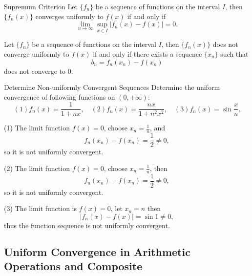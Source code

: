 \begin{theorem}{Supremum Criterion}{}
  Let $\{f_n\}$ be a sequence of functions on the interval $I$, then
  $\{f_n(x)\}$ converges uniformly to $f(x)$ if and only if
  \begin{equation}
    \lim \limits _{n \rightarrow \infty} \sup \limits_{x \in I} |f_n(x) - f(x)| = 0.
  \end{equation}
\end{theorem}

\begin{corollary}{}{}
  Let $\{f_n\}$ be a sequence of functions on the interval $I$, then
  $\{f_n(x)\}$ does not converge uniformly to $f(x)$ if and only if
  there exists a sequence $\{x_n\}$ such that
  \begin{equation}
    b_n = f_n(x_n) - f(x_n)
  \end{equation}
  does not converge to $0$.
\end{corollary}

\begin{example}{Determine Non-uniformly Convergent Sequences}{}
  Determine the uniform convergence of following functions on $(0, +\infty)$:
  \begin{equation}
    (1) f_n(x) = \frac{1}{1+nx}, \quad
    (2) f_n(x) = \frac{nx}{1+n^2x^2}, \quad
    (3) f_n(x) = \sin \frac{x}{n}.
  \end{equation}
\end{example}

\begin{solution}
  (1) The limit function $f(x) = 0$, choose $x_n = \frac{1}{n}$, and
  \begin{equation}
    f_n(x_n) - f(x_n) = \frac{1}{2} \neq 0,
  \end{equation}
  so it is not uniformly convergent.

  (2) The limit function $f(x) = 0$, choose $x_n = \frac{1}{n}$, then
  \begin{equation}
    f_n(x_n) - f(x_n) = \frac{1}{2} \neq 0,
  \end{equation}
  so it is not uniformly convergent.

  (3) The limit function is $f(x) = 0$, let $x_n = n$ then
  \begin{equation}
    |f_n(x) - f(x)| = \sin 1 \neq 0,
  \end{equation}
  thus the function sequence is not uniformly convergent.
\end{solution}


\subsection{Uniform Convergence in Arithmetic Operations and Composite}

